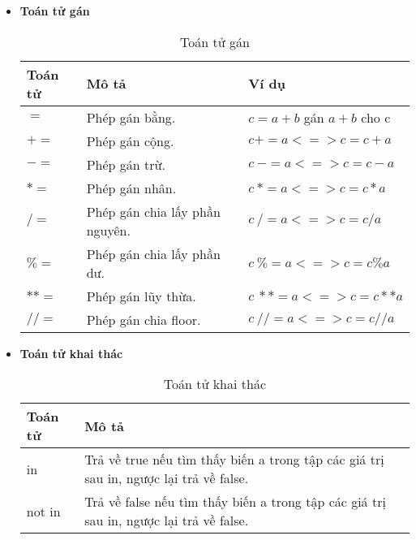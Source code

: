 \documentclass[../main-report.tex]{subfiles}
\begin{document}
\begin{itemize}
\item \textbf{Toán tử gán}
\begin{table}[ht!]
\centering
\begin{tabular}{|>{\centering\arraybackslash}p{2cm}|>{\centering\arraybackslash}p{5cm}|>{\centering\arraybackslash}p{5cm}|}
\hline
\textbf{Toán tử} & \textbf{Mô tả}             & \textbf{Ví dụ} \\ \hline
$=$             & Phép gán bằng.             & $c = a + b$ gán $a+b$ cho c \\ \hline
$+=$             & Phép gán cộng.             & $c += a <=> c=c+a$  \\ \hline
$-=$             & Phép gán trừ.               & $c\:-=a <=> c=c-a$  \\ \hline
$*=$              & Phép gán nhân.                  & $c\:*=a <=> c=c*a$    \\ \hline
$/=$              & Phép gán chia lấy phần nguyên.   & $c\:/=a <=> c=c/a$   \\ \hline
$\%=$             & Phép gán chia lấy phần dư.         & $c\:\%=a <=> c=c\%a$  \\ \hline
$**=$             & Phép gán lũy thừa.         & $c\:**=a <=> c=c**a$   \\ \hline
$//=$             & Phép gán chia floor.       & $c\://=a <=> c=c//a$   \\ \hline
\end{tabular}
\caption{Toán tử gán}
\label{tab:Toán tử gán}
\end{table}

\item \textbf{Toán tử khai thác}
\begin{table}[ht!]
\centering
\begin{tabular}{|>{\centering\arraybackslash}p{2cm}|>{\centering\arraybackslash}p{6cm}|}
\hline
\textbf{Toán tử} & \textbf{Mô tả}             \\ \hline
in             & Trả về true nếu tìm thấy biến a trong tập các giá trị sau in, ngược lại trả về false.                 \\ \hline
not in             & Trả về false nếu tìm thấy biến a trong tập các giá trị sau in, ngược lại trả về false.          \\ \hline
\end{tabular}
\caption{Toán tử khai thác}
\label{tab:toán tử khai thác}
\end{table}


\end{itemize}
\end{document}

